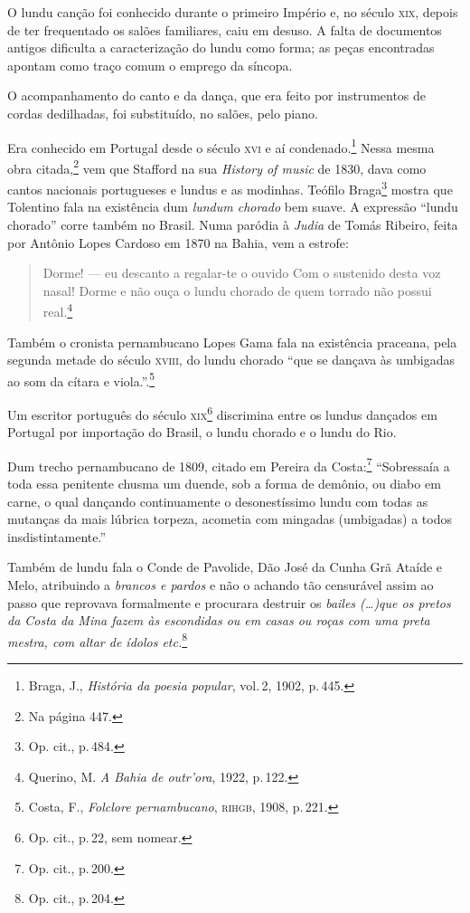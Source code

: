 O lundu canção foi conhecido durante o primeiro Império e, no século \textsc{xix},
depois de ter frequentado os salões familiares, caiu em desuso. A falta
de documentos antigos dificulta a caracterização do lundu como forma; as
peças encontradas apontam como traço comum o emprego da síncopa.

O acompanhamento do canto e da dança, que era feito por instrumentos de
cordas dedilhadas, foi substituído, no salões, pelo piano. %

Era conhecido em Portugal desde o século \textsc{xvi} e aí condenado.\footnote{Braga, J.,
\emph{História da poesia popular}, vol.\,2, 1902, p.\,445.} Nessa mesma obra
citada,\footnote{Na página 447.} vem que Stafford na sua \emph{History of music} de 1830,
dava como cantos nacionais portugueses e lundus e as modinhas. Teófilo
Braga\footnote{Op. cit., p.\,484.} mostra que Tolentino fala na existência dum
\textit{lundum chorado} bem suave. A expressão ``lundu chorado'' corre também
no Brasil. Numa paródia à \emph{Judia} de Tomás Ribeiro, feita por
Antônio Lopes Cardoso em 1870 na Bahia, vem a estrofe:

\begin{quote}
Dorme! --- eu descanto a regalar-te o ouvido
Com o sustenido desta voz nasal!
Dorme e não ouça o lundu chorado
de quem torrado não possui real.\footnote{Querino,
M. \emph{A Bahia de outr'ora}, 1922, p.\,122.} %
\end{quote}

Também o cronista pernambucano Lopes Gama fala na existência praceana,
pela segunda metade do século \textsc{xviii}, do lundu chorado ``que se dançava às
umbigadas ao som da cítara e viola.''.\footnote{Costa, F., \emph{Folclore pernambucano},
\textsc{rihgb}, 1908, p.\,221.}

Um escritor português do século \textsc{xix}\footnote{Op. cit., p.\,22, sem nomear.}
discrimina entre os lundus dançados em Portugal por importação do
Brasil, o lundu chorado e o lundu do Rio. %

Dum trecho pernambucano de 1809, citado em Pereira da Costa:\footnote{Op. cit.,
p.\,200.} ``Sobressaía a toda essa penitente chusma um duende, sob a
forma de demônio, ou diabo em carne, o qual dançando continuamente o
desonestíssimo lundu com todas as mutanças da mais lúbrica torpeza,
acometia com mingadas (umbigadas) a todos insdistintamente.''

Também de lundu fala o Conde de Pavolide, Dão José da Cunha Grã Ataíde e
Melo, atribuindo a \textit{brancos e pardos} e não o achando tão censurável
assim ao passo que reprovava formalmente e procurara destruir os
\textit{bailes (\ldots{})que os pretos da Costa da Mina fazem às escondidas ou em
casas ou roças com uma preta mestra, com altar de ídolos etc.}\footnote{Op. cit., p.\,204.} %

